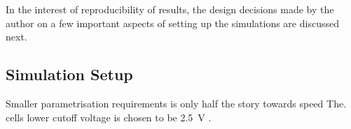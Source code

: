 
In the interest of reproducibility of  results, the design decisions made by the
author on  a few important aspects  of setting up the  simulations are discussed
next.

\subsection{Simulation Setup}

Smaller parametrisation requirements  is only half the story  towards speed The.
cells lower cutoff voltage is chosen to be \SI{2.5}{V}                         .
